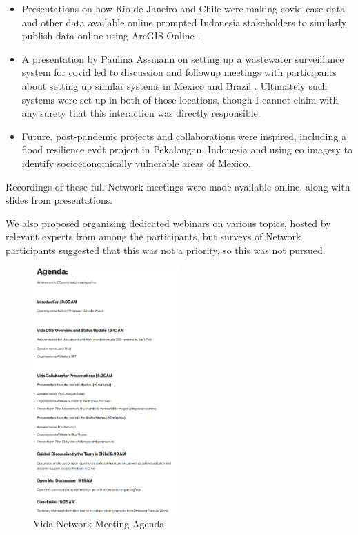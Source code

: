 \begin{itemize}[itemsep=0pt,parsep=0pt]
	\item{Presentations on how Rio de Janeiro and Chile were making \ac{covid} case data and other data available online prompted Indonesia stakeholders to similarly publish data online using ArcGIS Online \cite{indonesiaministryofhealthDataHarianKasus2023}.}
	\item{A presentation by Paulina Assmann on setting up a wastewater surveillance system for \ac{covid} led to discussion and followup meetings with participants about setting up similar systems in Mexico and Brazil \cite{assmannBuildingWastewaterSurveillance2021}. Ultimately such systems were set up in both of those locations, though I cannot claim with any surety that this interaction was directly responsible.}
	\item{Future, post-pandemic projects and collaborations were inspired, including a flood resilience \ac{evdt} project in Pekalongan, Indonesia and using \ac{eo} imagery to identify socioeconomically vulnerable areas of Mexico.}
\end{itemize}

Recordings of these full Network meetings were made available online, along with slides from presentations.

We also proposed organizing dedicated webinars on various topics, hosted by relevant experts from among the participants, but surveys of Network participants suggested that this was not a priority, so this was not pursued. 

\begin{figure}[!htb]
\centering
\includegraphics[width=0.5\textwidth]{Figures/chap5/vida-network-agenda.png}
\caption{Vida Network Meeting Agenda}
\label{fig:vida-network-agenda}
\end{figure}

